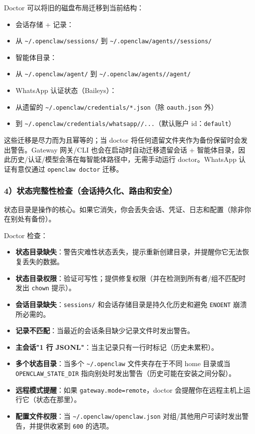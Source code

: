 Doctor 可以将旧的磁盘布局迁移到当前结构：

\begin{itemize}
  \item 会话存储 + 记录：
  \item 从 \texttt{\textasciitilde{}/.openclaw/sessions/} 到 \texttt{\textasciitilde{}/.openclaw/agents//sessions/}
  \item 智能体目录：
  \item 从 \texttt{\textasciitilde{}/.openclaw/agent/} 到 \texttt{\textasciitilde{}/.openclaw/agents//agent/}
  \item WhatsApp 认证状态（Baileys）：
  \item 从遗留的 \texttt{\textasciitilde{}/.openclaw/credentials/*.json}（除 \texttt{oauth.json} 外）
  \item 到 \texttt{\textasciitilde{}/.openclaw/credentials/whatsapp//...}（默认账户 id：\texttt{default}）
\end{itemize}


这些迁移是尽力而为且幂等的；当 doctor 将任何遗留文件夹作为备份保留时会发出警告。Gateway 网关/CLI 也会在启动时自动迁移遗留会话 + 智能体目录，因此历史/认证/模型会落在每智能体路径中，无需手动运行 doctor。WhatsApp 认证有意仅通过 \texttt{openclaw doctor} 迁移。

\subsubsection{4）状态完整性检查（会话持久化、路由和安全）}


状态目录是操作的核心。如果它消失，你会丢失会话、凭证、日志和配置（除非你在别处有备份）。

Doctor 检查：

\begin{itemize}
  \item \textbf{状态目录缺失}：警告灾难性状态丢失，提示重新创建目录，并提醒你它无法恢复丢失的数据。
  \item \textbf{状态目录权限}：验证可写性；提供修复权限（并在检测到所有者/组不匹配时发出 \texttt{chown} 提示）。
  \item \textbf{会话目录缺失}：\texttt{sessions/} 和会话存储目录是持久化历史和避免 \texttt{ENOENT} 崩溃所必需的。
  \item \textbf{记录不匹配}：当最近的会话条目缺少记录文件时发出警告。
  \item \textbf{主会话"1 行 JSONL"}：当主记录只有一行时标记（历史未累积）。
  \item \textbf{多个状态目录}：当多个 \texttt{\textasciitilde{}/.openclaw} 文件夹存在于不同 home 目录或当 \texttt{OPENCLAW\_STATE\_DIR} 指向别处时发出警告（历史可能在安装之间分裂）。
  \item \textbf{远程模式提醒}：如果 \texttt{gateway.mode=remote}，doctor 会提醒你在远程主机上运行它（状态在那里）。
  \item \textbf{配置文件权限}：当 \texttt{\textasciitilde{}/.openclaw/openclaw.json} 对组/其他用户可读时发出警告，并提供收紧到 \texttt{600} 的选项。
\end{itemize}


